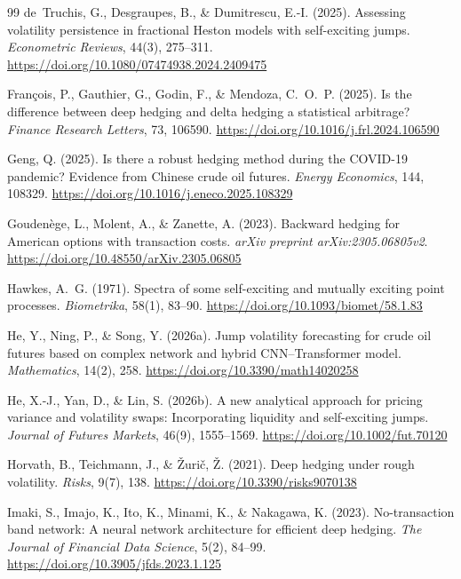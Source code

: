 \documentclass[11pt,a4paper]{article}
\begin{document}
\begin{thebibliography}{99}
de~Truchis, G., Desgraupes, B., \& Dumitrescu, E.-I. (2025).
Assessing volatility persistence in fractional Heston models with self-exciting jumps.
\emph{Econometric Reviews}, 44(3), 275--311.
\url{https://doi.org/10.1080/07474938.2024.2409475}

Fran\c{c}ois, P., Gauthier, G., Godin, F., \& Mendoza, C.~O.~P. (2025).
Is the difference between deep hedging and delta hedging a statistical arbitrage?
\emph{Finance Research Letters}, 73, 106590.
\url{https://doi.org/10.1016/j.frl.2024.106590}

Geng, Q. (2025).
Is there a robust hedging method during the COVID-19 pandemic? Evidence from Chinese crude oil futures.
\emph{Energy Economics}, 144, 108329.
\url{https://doi.org/10.1016/j.eneco.2025.108329}

Gouden\`{e}ge, L., Molent, A., \& Zanette, A. (2023).
Backward hedging for American options with transaction costs.
\emph{arXiv preprint arXiv:2305.06805v2}.
\url{https://doi.org/10.48550/arXiv.2305.06805}

Hawkes, A.~G. (1971).
Spectra of some self-exciting and mutually exciting point processes.
\emph{Biometrika}, 58(1), 83--90.
\url{https://doi.org/10.1093/biomet/58.1.83}

He, Y., Ning, P., \& Song, Y. (2026a).
Jump volatility forecasting for crude oil futures based on complex network and hybrid CNN--Transformer model.
\emph{Mathematics}, 14(2), 258.
\url{https://doi.org/10.3390/math14020258}

He, X.-J., Yan, D., \& Lin, S. (2026b).
A new analytical approach for pricing variance and volatility swaps: Incorporating liquidity and self-exciting jumps.
\emph{Journal of Futures Markets}, 46(9), 1555--1569.
\url{https://doi.org/10.1002/fut.70120}

Horvath, B., Teichmann, J., \& \v{Z}uri\v{c}, \v{Z}. (2021).
Deep hedging under rough volatility.
\emph{Risks}, 9(7), 138.
\url{https://doi.org/10.3390/risks9070138}

Imaki, S., Imajo, K., Ito, K., Minami, K., \& Nakagawa, K. (2023).
No-transaction band network: A neural network architecture for efficient deep hedging.
\emph{The Journal of Financial Data Science}, 5(2), 84--99.
\url{https://doi.org/10.3905/jfds.2023.1.125}


\end{thebibliography}
\end{document}
